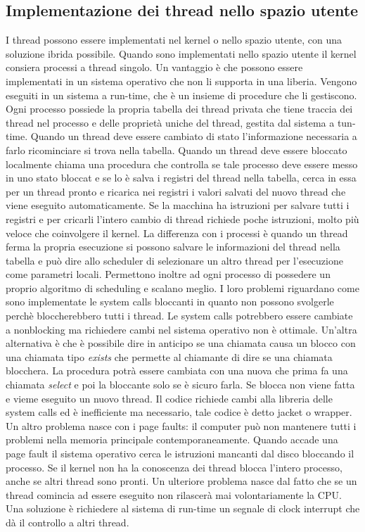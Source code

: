 \subsection{Implementazione dei thread nello spazio utente}
I thread possono essere implementati nel kernel o nello spazio utente, con una soluzione ibrida possibile. Quando sono implementati nello spazio utente il kernel consiera processi a
thread singolo. Un vantaggio \`e che possono essere implementati in un sistema operativo che non li supporta in una liberia. Vengono eseguiti in un sistema a run-time, che \`e un insieme
di procedure che li gestiscono. Ogni processo possiede la propria tabella dei thread privata che tiene traccia dei thread nel processo e delle propriet\`a uniche del thread, gestita dal
sistema a tun-time. Quando un thread deve essere cambiato di stato l'informazione necessaria a farlo ricominciare si trova nella tabella. Quando un thread deve essere bloccato localmente
chiama una procedura che controlla se tale processo deve essere messo in uno stato bloccat e se lo \`e salva i registri del thread nella tabella, cerca in essa per un thread pronto e
ricarica nei registri i valori salvati del nuovo thread che viene eseguito automaticamente. Se la macchina ha istruzioni per salvare tutti i registri e per cricarli l'intero cambio di
thread richiede poche istruzioni, molto pi\`u veloce che coinvolgere il kernel. La differenza con i processi \`e quando un thread ferma la propria esecuzione si possono salvare le
informazioni del thread nella tabella e pu\`o dire allo scheduler di selezionare un altro thread per l'esecuzione come parametri locali. Permettono inoltre ad ogni processo di possedere
un proprio algoritmo di scheduling e scalano meglio. I loro problemi riguardano come sono implementate le system calls bloccanti in quanto non possono svolgerle perch\`e bloccherebbero
tutti i thread. Le system calls potrebbero essere cambiate a nonblocking ma richiedere cambi nel sistema operativo non \`e ottimale. Un'altra alternativa \`e che \`e possibile dire in
anticipo se una chiamata causa un blocco con una chiamata tipo \emph{exists} che permette al chiamante di dire se una chiamata blocchera. La procedura potr\`a essere cambiata con una
nuova che prima fa una chiamata \emph{select} e poi la bloccante solo se \`e sicuro farla. Se blocca non viene fatta e vieme eseguito un nuovo thread. Il codice richiede cambi alla
libreria delle system calls ed \`e inefficiente ma necessario, tale codice \`e detto jacket o wrapper. Un altro problema nasce con i page faults: il computer pu\`o non mantenere tutti i
problemi nella memoria principale contemporaneamente. Quando accade una page fault il sistema operativo cerca le istruzioni mancanti dal disco bloccando il processo. Se il kernel non
ha la conoscenza dei thread blocca l'intero processo, anche se altri thread sono pronti. Un ulteriore problema nasce dal fatto che se un thread comincia ad essere eseguito non
rilascer\`a mai volontariamente la CPU. Una soluzione \`e richiedere al sistema di run-time un segnale di clock interrupt che d\`a il controllo a altri thread.
